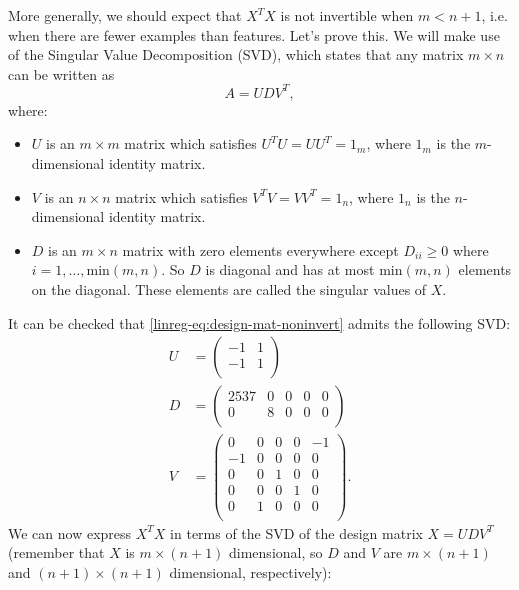 \documentclass{article}
\theoremstyle{definition}
\begin{document}
More generally, we should expect that $X^TX$ is not invertible when $m<n+1$, i.e. when there are fewer examples than features.
Let's prove this. We will make use of the Singular Value Decomposition (SVD), which states that any matrix $m\times n$ can be written as
\begin{equation}
    A = UDV^T,
\end{equation}
where:
\begin{itemize}
    \item $U$ is an $m\times m$ matrix which satisfies $U^TU=UU^T=1_m$, where $1_m$ is the $m$-dimensional identity matrix.
    \item $V$ is an $n\times n$ matrix which satisfies $V^TV=VV^T=1_n$, where $1_n$ is the $n$-dimensional identity matrix.
    \item $D$ is an $m\times n$ matrix with zero elements everywhere except $D_{ii}\ge0$ where $i=1,\dots,\text{min}(m, n)$. So $D$ is diagonal and has at most $\text{min}(m, n)$ elements on the diagonal. These elements are called the singular values of $X$.
\end{itemize}
It can be checked that \eqref{linreg-eq:design-mat-noninvert} admits the following SVD:
\begin{align*}
    U &=
    \begin{pmatrix}
        -1 & 1 \\
        -1 & 1 \\
    \end{pmatrix} \\
    D &= 
    \begin{pmatrix}
        2537 & 0 & 0 & 0 & 0 \\
        0 & 8 & 0 & 0 & 0 \\
    \end{pmatrix} \\
    V &= 
    \begin{pmatrix}
        0 & 0 & 0 & 0 & -1 \\
        -1 & 0 & 0 & 0 & 0 \\
        0 & 0 & 1 & 0 & 0 \\
        0 & 0 & 0 & 1 & 0 \\
        0 & 1 & 0 & 0 & 0 \\
    \end{pmatrix}. 
\end{align*}
We can now express $X^TX$ in terms of the SVD of the design matrix $X=UDV^T$ (remember that $X$ is $m\times (n+1)$ dimensional, so $D$ and $V$ are $m\times (n+1)$ and $(n+1)\times (n+1)$ dimensional, respectively):
\end{document}
